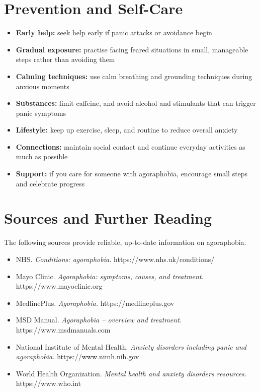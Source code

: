 \section*{Prevention and Self-Care}
\begin{itemize}
    \item \textbf{Early help:} seek help early if panic attacks or avoidance begin
    \item \textbf{Gradual exposure:} practise facing feared situations in small, manageable steps rather than avoiding them
    \item \textbf{Calming techniques:} use calm breathing and grounding techniques during anxious moments
    \item \textbf{Substances:} limit caffeine, and avoid alcohol and stimulants that can trigger panic symptoms
    \item \textbf{Lifestyle:} keep up exercise, sleep, and routine to reduce overall anxiety
    \item \textbf{Connections:} maintain social contact and continue everyday activities as much as possible
    \item \textbf{Support:} if you care for someone with agoraphobia, encourage small steps and celebrate progress
\end{itemize}

\section*{Sources and Further Reading}
The following sources provide reliable, up-to-date information on agoraphobia.

\begin{itemize}
    \item NHS. \textit{Conditions: agoraphobia.} https://www.nhs.uk/conditions/
    \item Mayo Clinic. \textit{Agoraphobia: symptoms, causes, and treatment.} https://www.mayoclinic.org
    \item MedlinePlus. \textit{Agoraphobia.} https://medlineplus.gov
    \item MSD Manual. \textit{Agoraphobia -- overview and treatment.} https://www.msdmanuals.com
    \item National Institute of Mental Health. \textit{Anxiety disorders including panic and agoraphobia.} https://www.nimh.nih.gov
    \item World Health Organization. \textit{Mental health and anxiety disorders resources.} https://www.who.int
\end{itemize}
